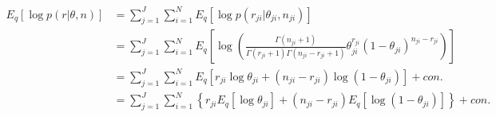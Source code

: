 \documentclass[11pt,reqno]{amsart}
\begin{document}
\begin{equation}
\begin{split}
\label{r}
E_q \left[ \log p\left(r | \theta, n \right)\right] &= \sum_{j=1}^{J} \sum_{i=1}^{N} E_q  \left[ \log p \left( r_{ji} | \theta_{ji}, n_{ji} \right) \right] \\
&= \sum_{j=1}^{J} \sum_{i=1}^{N}  E_q  \left[ \log \left( \frac{ \Gamma(n_{ji}+1) } { \Gamma(r_{ji}+1) \Gamma( n_{ji} - r_{ji} + 1 ) } \theta_{ji}^{r_{ji}} (1 - \theta_{ji})^{n_{ji} - r_{ji}} \right) \right] \\
&= \sum_{j=1}^{J} \sum_{i=1}^{N}  E_q  \left[ r_{ji} \log \theta_{ji} + (n_{ji} - r_{ji}) \log (1 - \theta_{ji}) \right] + con. \\
&= \sum_{j=1}^{J} \sum_{i=1}^{N} \left\lbrace r_{ji} E_q \left[ \log \theta_{ji} \right] + (n_{ji} - r_{ji}) E_q  \left[  \log (1 - \theta_{ji}) \right] \right\rbrace + con. \\
\end{split}
\end{equation}
\end{document}
